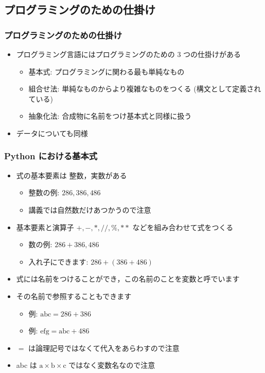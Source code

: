 \subsection{プログラミングのための仕掛け}
\begin{frame}[fragile]
\frametitle{プログラミングのための仕掛け}
  \begin{itemize}
\item プログラミング言語にはプログラミングのための 3 つの仕掛けがある
    \begin{itemize}
\item 基本式: プログラミングに関わる最も単純なもの
\item 組合せ法: 単純なものからより複雑なものをつくる (構文として定義されている)
\item 抽象化法: 合成物に名前をつけ基本式と同様に扱う
    \end{itemize}
\item データについても同様
  \end{itemize}
\end{frame}
\begin{frame}[fragile]
\frametitle{Python における基本式}
  \begin{itemize}
\item 式の基本要素は 整数，実数がある
    \begin{itemize}
\item 整数の例: \(286, 386, 486\) 
\item 講義では自然数だけあつかうので注意
    \end{itemize}
\item 基本要素と演算子 \(+, -, *, \slash\slash, \%, **\) などを組み合わせて式をつくる
    \begin{itemize}
\item 数の例: \(286+386, 486\) 
\item 入れ子にできます: \(286+(386+486)\) 
    \end{itemize}
\item 式には名前をつけることができ，この名前のことを変数と呼でいます
\item その名前で参照することもできます
    \begin{itemize}
\item 例: \(\mbox{abc}=286+386\) 
\item 例: \(\mbox{efg}=\mbox{abc}+486\) 
    \end{itemize}
\item $=$ は論理記号ではなくて代入をあらわすので注意
\item abc は \(\mbox{a}\times\mbox{b}\times\mbox{c}\) ではなく変数名なので注意
  \end{itemize}
\end{frame}
